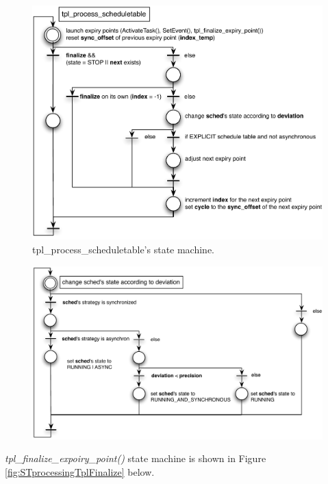 \begin{figure}[H] %
   \centering
   \includegraphics[width=5in]{pictures/STprocessingTplProcess.pdf}  
   \caption{tpl_process_scheduletable's state machine.}
   \label{fig:STprocessingTplProcess}
\end{figure} 

\begin{figure}[H] %
   \centering
   \includegraphics[width=5in]{pictures/STprocessingChangeState.pdf}  
   \label{fig:STprocessingChangeState}
\end{figure}

\textit{tpl\_finalize\_expoiry\_point()} state machine is shown in Figure \ref{fig:STprocessingTplFinalize} below.

